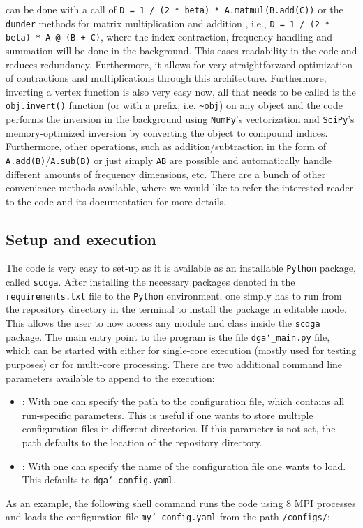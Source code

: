 \documentclass[\main/main.tex]{subfiles}
\begin{document}
can be done with a call of \texttt{D = 1 / (2 * beta) * A.matmul(B.add(C))} or the \texttt{dunder} methods for matrix multiplication  and addition \say{\texttt{+}}, i.e., \texttt{D = 1 / (2 * beta) * A @ (B + C)}, where the index contraction, frequency handling and summation will be done in the background. This eases readability in the code and reduces redundancy. Furthermore, it allows for very straightforward optimization of contractions and multiplications through this architecture. Furthermore, inverting a vertex function is also very easy now, all that needs to be called is the \texttt{obj.invert()} function (or with a \say{\sim} prefix, i.e. \texttt{\sim obj}) on any object and the code performs the inversion in the background using \texttt{NumPy}'s vectorization and \texttt{SciPy}'s memory-optimized inversion by converting the object to compound indices. Furthermore, other operations, such as addition/subtraction in the form of \texttt{A.add(B)}/\texttt{A.sub(B)} or just simply \texttt{A\pm B} are possible and automatically handle different amounts of frequency dimensions, etc. There are a bunch of other convenience methods available, where we would like to refer the interested reader to the code and its documentation for more details.


\subsection{Setup and execution}

The code is very easy to set-up as it is available as an installable \texttt{Python} package, called \texttt{scdga}. After installing the necessary packages denoted in the \texttt{requirements.txt} file to the \texttt{Python} environment, one simply has to run  from the repository directory in the terminal to install the package in editable mode. This allows the user to now access any module and class inside the \texttt{scdga} package. The main entry point to the program is the file \texttt{dga\char`_main.py} file, which can be started with either  for single-core execution (mostly used for testing purposes) or \mbox{} for multi-core processing. There are two additional command line parameters available to append to the execution:
\begin{itemize}
\item{}: With  one can specify the path to the configuration file, which contains all run-specific parameters. This is useful if one wants to store multiple configuration files in different directories. If this parameter is not set, the path defaults to the location of the repository directory.
\item{}: With  one can specify the name of the configuration file one wants to load. This defaults to \texttt{dga\char`_config.yaml}.
\end{itemize}
As an example, the following shell command runs the code using 8 MPI processes and loads the configuration file \texttt{my\char`_config.yaml} from the path \texttt{/configs/}:
\end{document}
